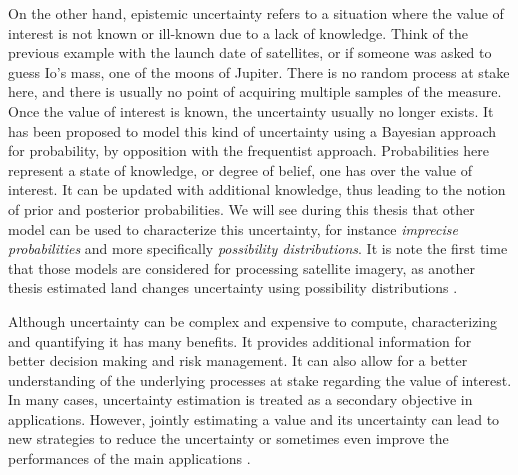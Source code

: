 On the other hand, epistemic uncertainty refers to a situation where the value of interest is not known or ill-known due to a lack of knowledge. Think of the previous example with the launch date of satellites, or if someone was asked to guess Io's mass, one of the moons of Jupiter. There is no random process at stake here, and there is usually no point of acquiring multiple samples of the measure. Once the value of interest is known, the uncertainty usually no longer exists. It has been proposed to model this kind of uncertainty using a Bayesian approach for probability, by opposition with the frequentist approach. Probabilities here represent a state of knowledge, or degree of belief, one has over the value of interest. It can be updated with additional knowledge, thus leading to the notion of prior and posterior probabilities. We will see during this thesis that other model can be used to characterize this uncertainty, for instance \textit{imprecise probabilities} and more specifically \textit{possibility distributions}. It is note the first time that those models are considered for processing satellite imagery, as another thesis estimated land changes uncertainty using possibility distributions \cite{lesniewska-choquet_specialite_2020}.

Although uncertainty can be complex and expensive to compute, characterizing and quantifying it has many benefits. It provides additional information for better decision making and risk management. It can also allow for a better understanding of the underlying processes at stake regarding the value of interest. In many cases, uncertainty estimation is treated as a secondary objective in applications. However, jointly estimating a value and its uncertainty can lead to new strategies to reduce the uncertainty or sometimes even improve the performances of the main applications \cite{chen_learning_2023,jiang_unsupervised_2024}.

